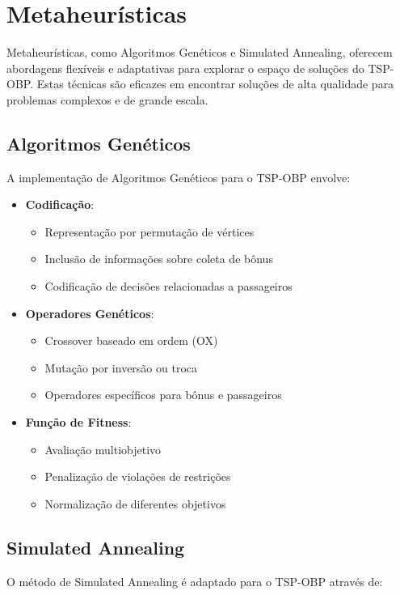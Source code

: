\documentclass[12pt, a4paper]{report}
\begin{document}
\section{Metaheurísticas}
Metaheurísticas, como Algoritmos Genéticos e Simulated Annealing, oferecem abordagens flexíveis e adaptativas para explorar o espaço de soluções do TSP-OBP. Estas técnicas são eficazes em encontrar soluções de alta qualidade para problemas complexos e de grande escala.

\subsection{Algoritmos Genéticos}
A implementação de Algoritmos Genéticos para o TSP-OBP envolve:

\begin{itemize}
    \item \textbf{Codificação}: 
    \begin{itemize}
        \item Representação por permutação de vértices
        \item Inclusão de informações sobre coleta de bônus
        \item Codificação de decisões relacionadas a passageiros
    \end{itemize}
    
    \item \textbf{Operadores Genéticos}:
    \begin{itemize}
        \item Crossover baseado em ordem (OX)
        \item Mutação por inversão ou troca
        \item Operadores específicos para bônus e passageiros
    \end{itemize}
    
    \item \textbf{Função de Fitness}:
    \begin{itemize}
        \item Avaliação multiobjetivo
        \item Penalização de violações de restrições
        \item Normalização de diferentes objetivos
    \end{itemize}
\end{itemize}

\subsection{Simulated Annealing}
O método de Simulated Annealing é adaptado para o TSP-OBP através de:
\end{document}
